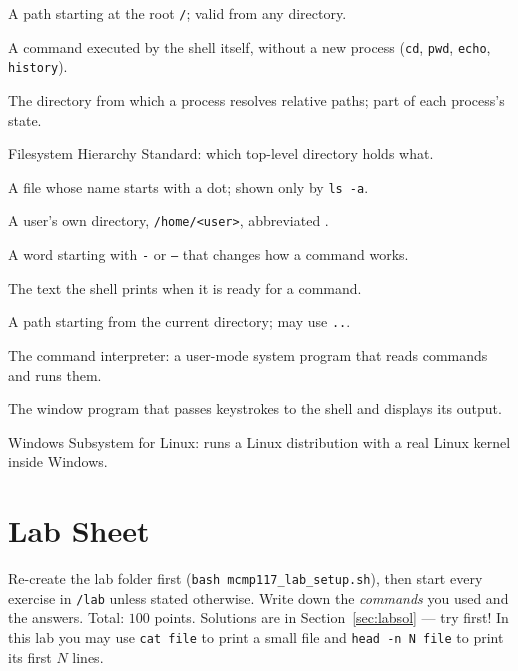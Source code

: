 \documentclass[11pt,a4paper]{article}
\newcommand{\cmd}[1]{\texttt{#1}}
\begin{document}
\begin{description}[leftmargin=0pt,itemsep=0.15em]
  \item[Absolute path] A path starting at the root \texttt{/}; valid from any directory.
  \item[Builtin] A command executed by the shell itself, without a new process (\cmd{cd}, \cmd{pwd}, \cmd{echo}, \cmd{history}).
  \item[Current working directory] The directory from which a process resolves relative paths; part of each process's state.
  \item[FHS] Filesystem Hierarchy Standard: which top-level directory holds what.
  \item[Hidden file] A file whose name starts with a dot; shown only by \cmd{ls -a}.
  \item[Home directory] A user's own directory, \texttt{/home/<user>}, abbreviated \texttt{\tl}.
  \item[Option] A word starting with \texttt{-} or \texttt{--} that changes how a command works.
  \item[Prompt] The text the shell prints when it is ready for a command.
  \item[Relative path] A path starting from the current directory; may use \texttt{..}.
  \item[Shell] The command interpreter: a user-mode system program that reads commands and runs them.
  \item[Terminal (emulator)] The window program that passes keystrokes to the shell and displays its output.
  \item[WSL] Windows Subsystem for Linux: runs a Linux distribution with a real Linux kernel inside Windows.
\end{description}

\section{Lab Sheet}
\label{sec:lab}

Re-create the lab folder first (\cmd{bash mcmp117\_lab\_setup.sh}), then start every exercise in \texttt{\tl/lab} unless stated otherwise. Write down the \emph{commands} you used and the answers. Total: $100$ points. Solutions are in Section~\ref{sec:labsol} --- try first! In this lab you may use \cmd{cat file} to print a small file and \cmd{head -n N file} to print its first $N$ lines.
\end{document}
